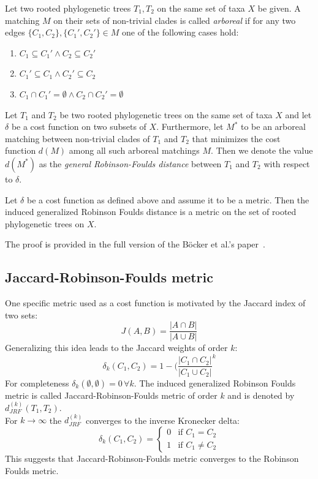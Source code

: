 \begin{defin}\label{def:arboreal}
Let two rooted phylogenetic trees $T_1, T_2$ on the same set of taxa $X$ be given. A matching $M$ on their sets of non-trivial clades is called \textit{arboreal} if for any two edges $\{C_1,C_2\}, \{C_1',C_2'\} \in M$ one of the following cases hold:
\begin{enumerate}
\item $C_1 \subseteq C_1' \wedge C_2 \subseteq C_2'$
\item $C_1' \subseteq C_1 \wedge C_2' \subseteq C_2$
\item $C_1 \cap C_1' = \emptyset \wedge C_2 \cap C_2' = \emptyset$
\end{enumerate}
\end{defin}
\begin{defin}
Let $T_1$ and $T_2$ be two rooted phylogenetic trees on the same set of taxa $X$ and let $\delta$ be a cost function on two subsets of $X$. Furthermore, let $M^*$ to be an arboreal matching between non-trivial clades of $T_1$ and $T_2$ that minimizes the cost function $d(M)$ among all such arboreal matchings $M$. Then we denote the value $d(M^*)$ as the \textit{general Robinson-Foulds distance} between $T_1$ and $T_2$ with respect to $\delta$.
\end{defin} 
\begin{lem}
Let $\delta$ be a cost function as defined above and assume it to be a metric. Then the induced generalized Robinson Foulds distance is a metric on the set of rooted phylogenetic trees on $X$.
\end{lem}
The proof is provided in the full version of the Böcker et al.'s paper~\cite{Boe}.

\subsection{Jaccard-Robinson-Foulds metric}
One specific metric used as a cost function is motivated by the Jaccard index of two sets: 
$$J(A,B) = \frac{|A \cap B|}{|A \cup B|}$$
Generalizing this idea leads to the Jaccard weights of order $k$:
$$\delta_k(C_1,C_2) = 1 - (\frac{|C_1 \cap C_2|}{|C_1 \cup C_2|}^k$$
For completeness $\delta_k(\emptyset, \emptyset)=0 \, \forall k$. The induced generalized Robinson Foulds metric is called Jaccard-Robinson-Foulds metric of order $k$ and is denoted by $d_{JRF}^{(k)}(T_1,T_2)$.\\
For $k \to \infty$ the $d_{JRF}^{(k)}$ converges to the inverse Kronecker delta:
$$\delta_k(C_1,C_2) =
\begin{cases}
0 & \text{if } C_1 = C_2 \\
1 & \text{if } C_1 \neq C_2
\end{cases}$$
This suggests that Jaccard-Robinson-Foulds metric converges to the Robinson Foulds metric.

